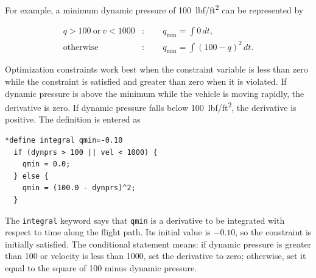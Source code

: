 For example, a minimum dynamic pressure of 100~lbf/ft\textsuperscript{2} can be
represented by

\begin{align}
  q>100\ \text{or}\ v<1000 &: \qquad
    q_{\min}=\int 0\,dt, \label{eq:qmin-satisfied}\\
  \text{otherwise} &: \qquad
    q_{\min}=\int (100-q)^2\,dt. \label{eq:qmin-violated}
\end{align}

Optimization constraints work best when the constraint variable is less than zero
while the constraint is satisfied and greater than zero when it is violated. If dynamic
pressure is above the minimum while the vehicle is moving rapidly, the derivative is
zero. If dynamic pressure falls below 100~lbf/ft\textsuperscript{2}, the derivative is
positive. The definition is entered as

\begin{lstlisting}[style=taosmanual]
*define integral qmin=-0.10
  if (dynprs > 100 || vel < 1000) {
    qmin = 0.0;
  } else {
    qmin = (100.0 - dynprs)^2;
  }
\end{lstlisting}

The \texttt{integral} keyword says that \texttt{qmin} is a derivative to be integrated
with respect to time along the flight path. Its initial value is $-0.10$, so the
constraint is initially satisfied. The conditional statement means: if dynamic
pressure is greater than 100 or velocity is less than 1000, set the derivative to zero;
otherwise, set it equal to the square of 100 minus dynamic pressure.
